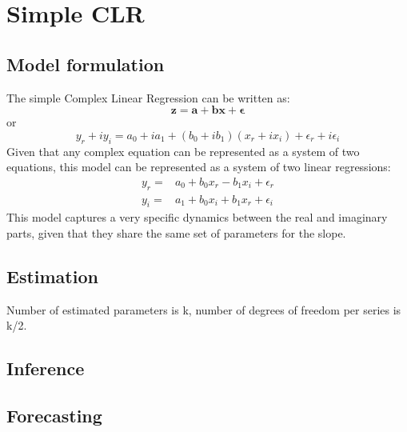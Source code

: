 \documentclass[
]{book}
\begin{document}
\hypertarget{simpleCLR}{%
\section{Simple CLR}\label{simpleCLR}}

\hypertarget{model-formulation}{%
\subsection{Model formulation}\label{model-formulation}}

The simple Complex Linear Regression can be written as:
\begin{equation}
    \mathbf{z} = \mathbf{a} + \mathbf{b} \mathbf{x} + \boldsymbol{\epsilon}
    \label{eq:SimpleCLRComplex}
\end{equation}
or
\begin{equation}
    y_r + i y_i = a_0 + i a_1 + (b_0 + i b_1) (x_r + i x_i) + \epsilon_r + i \epsilon_i
    \label{eq:SimpleCLR}
\end{equation}
Given that any complex equation can be represented as a system of two equations, this model can be represented as a system of two linear regressions:
\begin{equation}
    \begin{aligned}
        y_r = & a_0 + b_0 x_r - b_1 x_i + \epsilon_r \\
        y_i = & a_1 + b_0 x_i + b_1 x_r + \epsilon_i
    \end{aligned}
    \label{eq:SimpleCLRSystem}
\end{equation}
This model captures a very specific dynamics between the real and imaginary parts, given that they share the same set of parameters for the slope.

\hypertarget{estimation}{%
\subsection{Estimation}\label{estimation}}

Number of estimated parameters is k, number of degrees of freedom per series is k/2.

\hypertarget{inference}{%
\subsection{Inference}\label{inference}}

\hypertarget{forecasting}{%
\subsection{Forecasting}\label{forecasting}}
\end{document}
